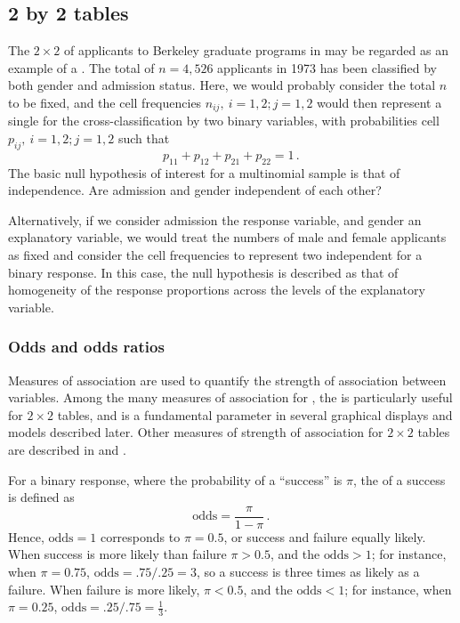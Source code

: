 \documentclass[11pt]{book}
\begin{document}
\subsection{2 by 2 tables}\label{sec:twoway-twobytwo}

The $2 \times 2$ \ctab of applicants to Berkeley graduate programs in  may be regarded as an example of a
.
The total of $n = 4,526$ applicants in 1973 has been classified by both
gender and admission status.
Here, we would probably consider the total $n$ to be fixed,
and the cell frequencies $n_{ij},  \: i=1,2; j=1,2$
would then represent a single
 for the cross-classification by two
binary variables,
with probabilities cell $p_{ij},  \: i=1,2; j=1,2$
such that
\begin{equation*}
 p_{11} + p_{12} + p_{21} + p_{22} = 1
 \period
\end{equation*}
The basic null hypothesis of interest for a multinomial sample is that
of independence.  Are admission and gender independent of each other?

Alternatively, if we consider admission the response variable, and
gender an explanatory variable, we would treat the numbers of male
and female applicants as fixed
and consider the cell frequencies to represent two independent
 for a binary response.
In this case, the null hypothesis is described as that of homogeneity
of the response proportions across the levels of the explanatory variable.

\subsubsection{Odds and odds ratios}\label{sec:twoway-odds}
Measures of association are used to quantify the strength of association
between variables.  Among the many measures of association for
\ctabs, the  is particularly useful for
$2 \times 2$ tables, and is a fundamental parameter in several
graphical displays and models described later.
Other measures of strength of association for $2 \times 2$ tables
are described in \citet[]{Stokes-etal:00} and \citet[\S 2.2]{Agresti:96}.

For a binary response, where the probability of a ``success'' is $\pi$,
the  of a success is defined as
\begin{equation*}
 \textrm{odds} = \frac{\pi}{1-\pi} \period
\end{equation*}
Hence, $\textrm{odds} = 1$ corresponds to $\pi = 0.5$, or success and
failure equally likely.   When success is more likely than failure
$\pi > 0.5$, and the $\textrm{odds} > 1$;  for instance, when $\pi = 0.75$,
$\textrm{odds} = .75/.25 =3$, so a success is three times as likely
as a failure.  When failure is more likely, $\pi < 0.5$, and the $\textrm{odds} < 1$;  for instance, when $\pi = 0.25$,
$\textrm{odds} = .25/.75 =\frac{1}{3}$.
\end{document}
